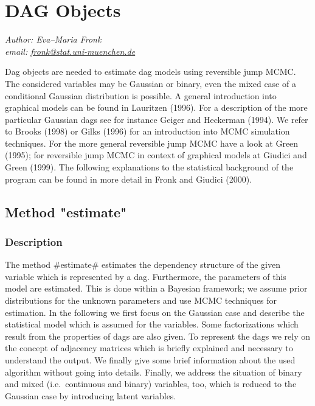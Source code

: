 \chapter{DAG Objects}
  \label{dag}

{\em Author: Eva--Maria Fronk} \\
{\em email: \href{mailto:fronk@stat.uni-muenchen.de}{fronk@stat.uni-muenchen.de}}\\
\vspace{0.3cm}



Dag objects are needed to estimate dag models using reversible
jump MCMC. The considered variables may be Gaussian or binary,
even the mixed case of a conditional Gaussian distribution is
possible. A general introduction into graphical models can be
found in Lauritzen (1996). For a description of the more
particular Gaussian dags see for instance Geiger and Heckerman
(1994). We refer to Brooks (1998) or Gilks (1996) for an
introduction into MCMC simulation techniques. For the more general
reversible jump MCMC have a look at Green (1995); for reversible
jump MCMC in context of graphical models at Giudici and Green
(1999). The following explanations to the statistical background
of the program can be found in more detail in Fronk and Giudici
(2000).



\section{Method "estimate"}



\subsection{Description}

The method #estimate# estimates the dependency structure of the
given variable which is represented by a dag. Furthermore, the
parameters of this model are estimated. This is done within a
Bayesian framework; we assume prior distributions for the unknown
parameters and use MCMC techniques for estimation. In the
following we first focus on the Gaussian case  and describe the
statistical model which is assumed for the variables. Some
factorizations which result from the properties of dags are also
given. To represent the dags we rely on the concept of adjacency
matrices which is briefly explained and necessary to understand
the output. We finally give some brief information about the used
algorithm without going into details. Finally, we address the
situation of binary and mixed (i.e.~continuous and binary)
variables, too, which is reduced to the Gaussian case by
introducing latent variables.


